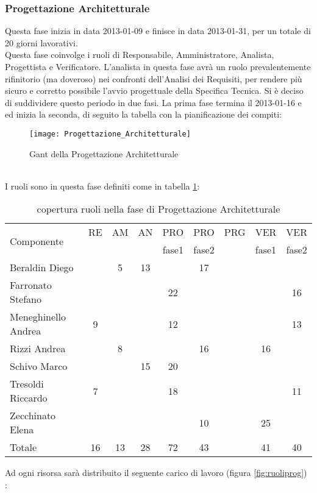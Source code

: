 \subsubsection{Progettazione Architetturale}
Questa fase inizia in data 2013-01-09 e finisce in data 2013-01-31, per un totale di 20 giorni lavorativi. \\
Questa fase coinvolge i ruoli di Responsabile, Amministratore, Analista, Progettista e Verificatore.
L'analista in questa fase avrà un ruolo prevalentemente rifinitorio (ma doveroso) nei confronti dell'Analisi dei Requisiti, per rendere più sicuro e corretto possibile l'avvio progettuale della Specifica Tecnica.
Si è deciso di suddividere questo periodo in due fasi. La prima fase termina il 2013-01-16 e ed inizia la seconda, di seguito la tabella con la pianificazione dei compiti:\\
\begin{figure}[h]
  \texttt{[image: Progettazione\_Architetturale]}
\caption{Gant della Progettazione Architetturale }
\end{figure}\\
I ruoli sono in questa fase definiti come in tabella \ref{tab:ruoliprog}:\\
\begin{table}[h]
\centering
\begin{tabular}{|l|c|c|c|c|c|c|c|c|}
\hline
\multirow{2}{*}{Componente}& RE& AM& AN& PRO& PRO& PRG& VER& VER\\
                    &    &      &      &fase1          &fase2         &        &fase1	 &fase2\\ 
\hline
Beraldin Diego & & 5& 13& & 17& & &\\
Farronato Stefano & & & & 22& & & & 16\\
Meneghinello Andrea & 9& & & 12& & & & 13\\
Rizzi Andrea & & 8& & & 16& & 16& \\
Schivo Marco & & & 15& 20& & & & \\
Tresoldi Riccardo & 7& & & 18& & & & 11\\
Zecchinato Elena & & & & & 10& & 25& \\
\hline
Totale & 16& 13& 28& 72& 43& & 41& 40\\
\hline
\end{tabular}
\caption{copertura ruoli nella fase di Progettazione Architetturale}\label{tab:ruoliprog}
\end{table}
\clearpage
Ad ogni risorsa sarà distribuito il seguente carico di lavoro (figura \ref{fig:ruoliprog}) :\\
